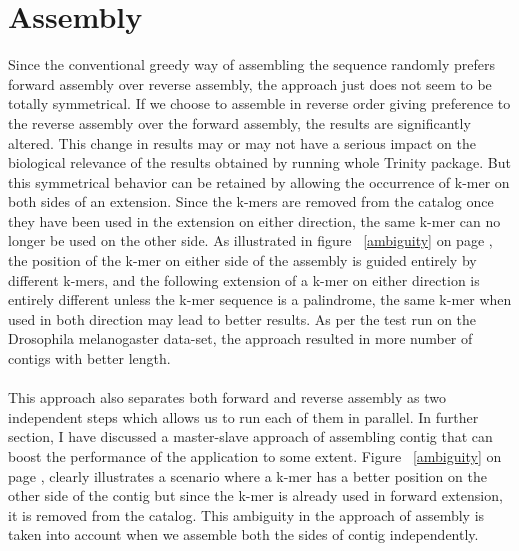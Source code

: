 \label{key}\documentclass[bachinf, english ,zihtitle,final,hyperref,utf8]{zihpub}
\begin{document}
\section{Assembly}
Since the conventional greedy way of assembling the sequence randomly prefers forward assembly over reverse assembly, the approach just does not seem to be totally symmetrical. If we choose to assemble in reverse order giving preference to the reverse assembly over the forward assembly, the results are significantly altered. This change in results may or may not have a serious impact on the biological relevance of the results obtained by running whole Trinity package. But this symmetrical behavior can be retained by allowing the occurrence of k-mer on both sides of an extension. Since the k-mers are removed from the catalog once they have been used in the extension on either direction, the same k-mer can no longer be used on the other side. As illustrated in figure ~\ref{ambiguity} on page \pageref{ambiguity}, the position of the k-mer on either side of the assembly is guided entirely by different k-mers, and the following extension of a k-mer on either direction is entirely different unless the k-mer sequence is a palindrome, the same k-mer when used in both direction may lead to better results. As per the test run on the Drosophila melanogaster data-set, the approach resulted in more number of contigs with better length.
\paragraph{} This approach also separates both forward and reverse assembly as two independent steps which allows us to run each of them in parallel. In further section, I have discussed a master-slave approach of assembling contig that can boost the performance of the application to some extent. Figure  ~\ref{ambiguity} on page \pageref{ambiguity}, clearly illustrates a scenario where a k-mer has a better position on the other side of the contig but since the k-mer is already used in forward extension, it is removed from the catalog. This ambiguity in the approach of assembly is taken into account when we assemble both the sides of contig independently.
\end{document}
